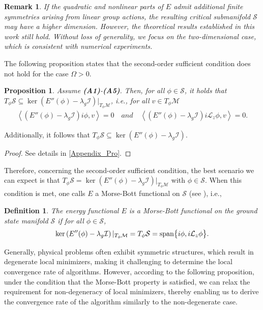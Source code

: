 \documentclass[preprint,3p]{elsarticle}
\newtheorem{definition}{Definition}[section]
\newtheorem{remark}{Remark}[section]
\newtheorem{prop}{Proposition}[section]
\begin{document}
\begin{remark}
	If the quadratic and nonlinear parts of $E$ admit additional finite symmetries arising from linear group actions, the resulting critical submanifold $\mathcal{S}$ may have a higher dimension. However, the theoretical results established in this work still hold. Without loss of generality, we focus on the two-dimensional case, which is consistent with numerical experiments.
\end{remark}


The following proposition states that the second-order sufficient condition does not hold for  the case $\Omega>0$.

\begin{prop}\label{Prop1}
	Assume {\bf (A1)}-{\bf (A5)}. Then, for all $\phi\in\mathcal{S}$, it holds that {$T_{\phi}\mathcal{S}\subseteq\ker\left(E''(\phi)-\lambda_g\mathcal{I}\right)|_{T_{\phi}\mathcal{M}}$}, i.e., for all $v\in T_{\phi}\mathcal{M}$
	\begin{align*}
		\left\langle (E''(\phi)-\lambda_g\mathcal{I})i\phi,v\right\rangle=0\quad and\quad	\left\langle (E''(\phi)-\lambda_g\mathcal{I})i\mathcal{L}_z\phi,v\right\rangle=0.
	\end{align*}
\end{prop}
Additionally, it follows that {$T_{\phi}\mathcal{S} \subseteq \ker\left(E''(\phi) - \lambda_g \mathcal{I}\right)$}.
\begin{proof} 
	See details in \ref{Appendix_Pro}.
\end{proof}
Therefore, concerning the second-order sufficient condition, the best scenario we can expect is that $T_{\phi}\mathcal{S} = \ker\left(E''(\phi) - \lambda_g \mathcal{I}\right)|_{T_{\phi}\mathcal{M}}$ with $\phi\in\mathcal{S}$. When this condition is met, one calls $E$ a Morse-Bott functional on $\mathcal{S}$ (see \cite{1954Bott,2020L-S,2011An}), i.e., 
\begin{definition}\label{Morse-Bott-P}
	{The energy functional} $E$ is a Morse-Bott functional on {the ground state manifold} $\mathcal{S}$ if for all $\phi\in\mathcal{S}$,
	\begin{align*}
		\ker\left(E''(\phi) - \lambda_g \mathcal{I}\right)|_{T_{\phi}\mathcal{M}} =T_{\phi}\mathcal{S}=\text{\rm span}\big\{i\phi, i\mathcal{L}_z \phi\big\}.
	\end{align*}
\end{definition}
Generally, physical problems often exhibit symmetric structures, which result in degenerate local minimizers, making it challenging to determine the local convergence rate of algorithms. However, according to the following proposition, under the condition that the Morse-Bott property is satisfied, we can relax the requirement for non-degeneracy of local minimizers, thereby enabling us to derive the convergence rate of the algorithm similarly to the non-degenerate case.
\end{document}
